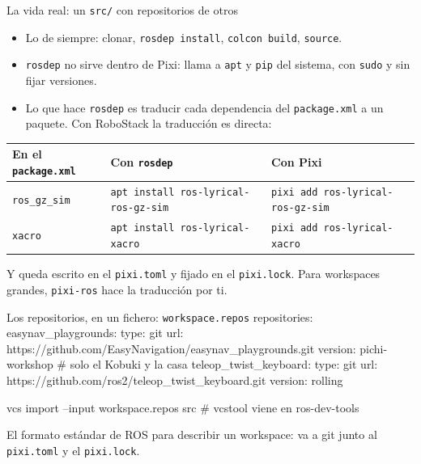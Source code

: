 \documentclass[aspectratio=169]{beamer}
\begin{document}
\begin{frame}{La vida real: un \texttt{src/} con repositorios de otros}
\begin{itemize}
    \item Lo de siempre: clonar, \lstinline|rosdep install|, \lstinline|colcon build|, \lstinline|source|.
    \item \texttt{rosdep} no sirve dentro de Pixi: llama a \texttt{apt} y \texttt{pip} del sistema, con \texttt{sudo} y sin fijar versiones.
    \item Lo que hace \texttt{rosdep} es traducir cada dependencia del \lstinline|package.xml| a un paquete. Con RoboStack la traducción es directa:
\end{itemize}
\vfill
\centering
\scriptsize
\begin{tabular}{lll}
\toprule
\textbf{En el \texttt{package.xml}} & \textbf{Con \texttt{rosdep}} & \textbf{Con Pixi} \\
\midrule
\texttt{ros\_gz\_sim} & \texttt{apt install ros-lyrical-ros-gz-sim} & \texttt{pixi add ros-lyrical-ros-gz-sim} \\
\texttt{xacro} & \texttt{apt install ros-lyrical-xacro} & \texttt{pixi add ros-lyrical-xacro} \\
\bottomrule
\end{tabular}
\vfill
\raggedright\small Y queda escrito en el \lstinline|pixi.toml| y fijado en el \lstinline|pixi.lock|. Para workspaces grandes, \texttt{pixi-ros} hace la traducción por ti.
\end{frame}

\begin{frame}[fragile]{Los repositorios, en un fichero: \texttt{workspace.repos}}
repositories:
  easynav_playgrounds:
    type: git
    url: https://github.com/EasyNavigation/easynav_playgrounds.git
    version: pichi-workshop      # solo el Kobuki y la casa
  teleop_twist_keyboard:
    type: git
    url: https://github.com/ros2/teleop_twist_keyboard.git
    version: rolling
\begin{terminal}
vcs import --input workspace.repos src     # vcstool viene en ros-dev-tools
\end{terminal}
\vfill
\small El formato estándar de ROS para describir un workspace: va a git junto al \lstinline|pixi.toml| y el \lstinline|pixi.lock|.
\end{frame}
\end{document}
